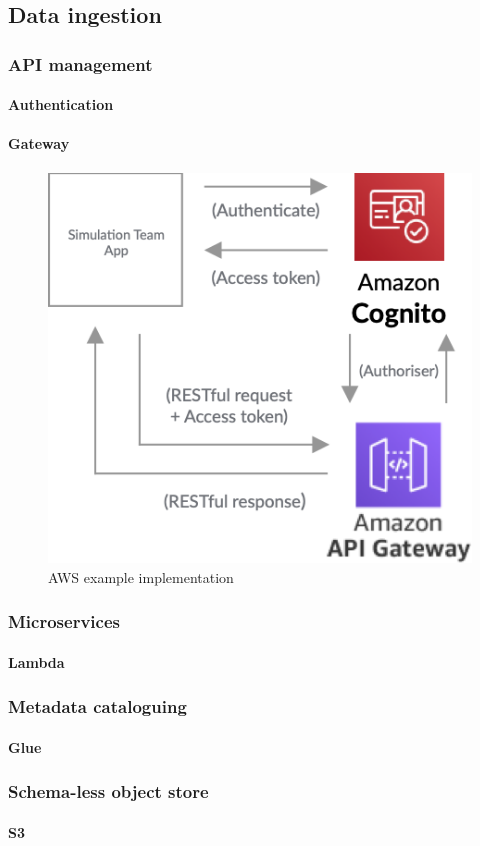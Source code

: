 \documentclass[10pt]{article}
\begin{document}
\subsection{Data ingestion}
\subsubsection{API management}
\paragraph{Authentication}
\paragraph{Gateway}

\begin{figure}[h!]
	\centering
	\includegraphics[width=0.4\linewidth]{images/APIGateway.png}	
	\caption{AWS example implementation}
\end{figure}

\subsubsection{Microservices}
\paragraph{Lambda}
\subsubsection{Metadata cataloguing}
\paragraph{Glue}
\subsubsection{Schema-less object store}
\paragraph{S3}
\end{document}
